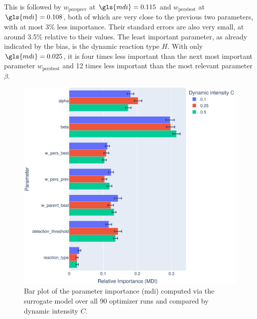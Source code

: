 This is followed by $w_{\text{persprev}}$ at $\gls{mdi} = 0.115$ and $w_{\text{persbest}}$ at $\gls{mdi} = 0.108$, both of which are very close to the previous two parameters, with at most 3\% less importance. Their standard errors are also very small, at around 3.5\% relative to their values. The least important parameter, as already indicated by the bias, is the dynamic reaction type $H$. With only $\gls{mdi} = 0.025$, it is four times less important than the next most important parameter $w_{\text{persbest}}$ and 12 times less important than the most relevant parameter $\beta$.

\begin{figure}[h!]
	\centering
	\includegraphics[width=1\textwidth]{results/part2/parameter_importance_bar_dynamic.svg}
	\caption[Bar chart of the parameter importance compared by dynamic intensity]{Bar plot of the parameter importance (\gls{mdi}) computed via the surrogate model over all 90 optimizer runs and compared by dynamic intensity $C$.}
	\label{fig:parameter_importance_bar_dynamic}
\end{figure}

